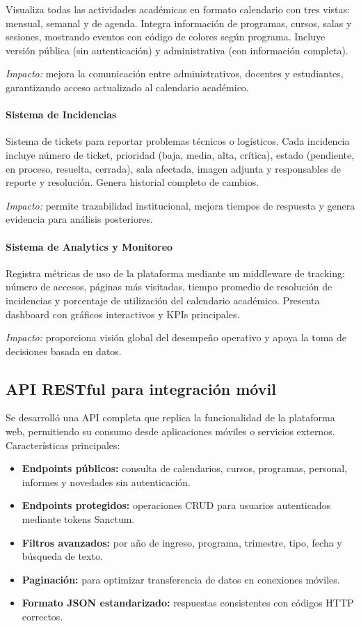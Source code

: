 Visualiza todas las actividades académicas en formato calendario con tres vistas: mensual, semanal y de agenda. Integra información de programas, cursos, salas y sesiones, mostrando eventos con código de colores según programa. Incluye versión pública (sin autenticación) y administrativa (con información completa).

\textit{Impacto:} mejora la comunicación entre administrativos, docentes y estudiantes, garantizando acceso actualizado al calendario académico.

\paragraph{Sistema de Incidencias}

Sistema de tickets para reportar problemas técnicos o logísticos. Cada incidencia incluye número de ticket, prioridad (baja, media, alta, crítica), estado (pendiente, en proceso, resuelta, cerrada), sala afectada, imagen adjunta y responsables de reporte y resolución. Genera historial completo de cambios.

\textit{Impacto:} permite trazabilidad institucional, mejora tiempos de respuesta y genera evidencia para análisis posteriores.

\paragraph{Sistema de Analytics y Monitoreo}

Registra métricas de uso de la plataforma mediante un middleware de tracking: número de accesos, páginas más visitadas, tiempo promedio de resolución de incidencias y porcentaje de utilización del calendario académico. Presenta dashboard con gráficos interactivos y KPIs principales.

\textit{Impacto:} proporciona visión global del desempeño operativo y apoya la toma de decisiones basada en datos.

\subsection{API RESTful para integración móvil}

Se desarrolló una API completa que replica la funcionalidad de la plataforma web, permitiendo su consumo desde aplicaciones móviles o servicios externos. Características principales:

\begin{itemize}
    \item \textbf{Endpoints públicos:} consulta de calendarios, cursos, programas, personal, informes y novedades sin autenticación.
    \item \textbf{Endpoints protegidos:} operaciones CRUD para usuarios autenticados mediante tokens Sanctum.
    \item \textbf{Filtros avanzados:} por año de ingreso, programa, trimestre, tipo, fecha y búsqueda de texto.
    \item \textbf{Paginación:} para optimizar transferencia de datos en conexiones móviles.
    \item \textbf{Formato JSON estandarizado:} respuestas consistentes con códigos HTTP correctos.
\end{itemize}

